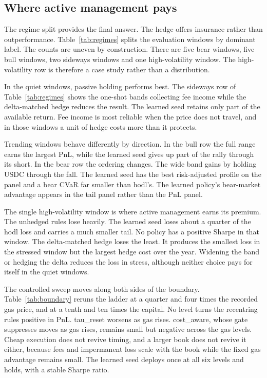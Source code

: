 \subsection{Where active management pays}

The regime split provides the final answer. The hedge offers insurance rather
than outperformance. Table~\ref{tab:regimes} splits the evaluation windows by
dominant label. The counts are uneven by construction. There are five bear
windows, five bull windows, two sideways windows and one high-volatility
window. The high-volatility row is therefore a case study rather than a
distribution.

In the quiet windows, passive holding performs best. The sideways row of
Table~\ref{tab:regimes} shows the one-shot bands collecting fee income while
the delta-matched hedge reduces the result. The learned seed retains only part
of the available return. Fee income is most reliable when the price does not
travel, and in those windows a unit of hedge costs more than it protects.

Trending windows behave differently by direction. In the bull row the full
range earns the largest PnL, while the learned seed gives up part of the rally
through its short. In the bear row the ordering changes. The wide band gains by
holding USDC through the fall. The learned seed has the best risk-adjusted
profile on the panel and a bear CVaR far smaller than \textsf{hodl}'s. The
learned policy's bear-market advantage appears in the tail panel rather than
the PnL panel.

The single high-volatility window is where active management earns its premium.
The unhedged rules lose heavily. The learned seed loses about a quarter of the
\textsf{hodl} loss and carries a much smaller tail. No policy has a positive
Sharpe in that window. The delta-matched hedge loses the least. It produces the
smallest loss in the stressed window but the largest hedge cost over the year.
Widening the band or hedging the delta reduces the loss in stress, although
neither choice pays for itself in the quiet windows.

The controlled sweep moves along both sides of the boundary.
Table~\ref{tab:boundary} reruns the ladder at a quarter and four times the
recorded gas price, and at a tenth and ten times the capital. No level turns
the recentring rules positive in PnL. \textsf{tau\_reset} worsens as gas rises.
\textsf{cost\_aware}, whose gate suppresses moves as gas rises, remains small
but negative across the gas levels. Cheap execution does not revive timing, and
a larger book does not revive it either, because fees and impermanent loss
scale with the book while the fixed gas advantage remains small. The learned
seed deploys once at all six levels and holds, with a stable Sharpe ratio.

